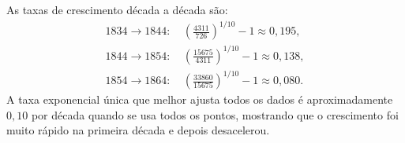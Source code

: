 As taxas de crescimento década a década são:
\begin{align*}
1834\to1844: &\ \left(\frac{4311}{726}\right)^{1/10}-1\approx0{,}195,\\
1844\to1854: &\ \left(\frac{15675}{4311}\right)^{1/10}-1\approx0{,}138,\\
1854\to1864: &\ \left(\frac{33860}{15675}\right)^{1/10}-1\approx0{,}080.
\end{align*}
A taxa exponencial única que melhor ajusta todos os dados é aproximadamente $0{,}10$ por década quando se usa todos os pontos, mostrando que o crescimento foi muito rápido na primeira década e depois desacelerou. 